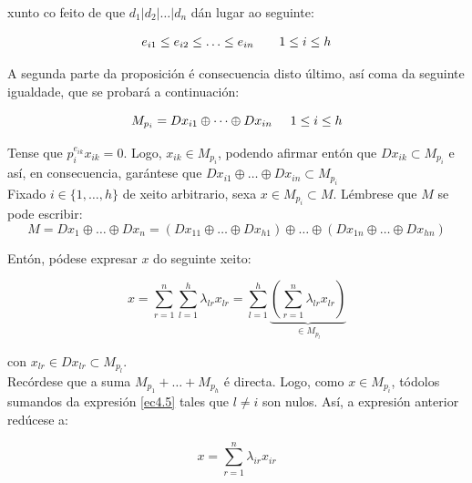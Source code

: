 \documentclass[twoside]{report}
\theoremstyle{mystyle}
\begin{document}
\noindent xunto co feito de que $d_{1} | d_{2} | \ldots | d_{n}$ dán lugar ao seguinte: 

$$e_{i1} \leq e_{i2}  \leq \ldots \leq e_{in} \hspace{7mm} 1 \leq i \leq h$$

\vspace{2mm}

\noindent A segunda parte da proposición é consecuencia disto último, así coma da seguinte igualdade, que se probará a continuación:

$$M_{p_{i}} = Dx_{i1} \oplus \dots \oplus Dx_{in} \hspace{5mm} 1 \leq i \leq h$$

\vspace{2mm}

\noindent {} Tense que $p_{i}^{e_{ik}}x_{ik} = 0$. Logo, $x_{ik} \in M_{p_{i}}$, podendo afirmar entón que $Dx_{ik} \subset M_{p_{i}}$ e así, en consecuencia, garántese que $Dx_{i1} \oplus \dots \oplus Dx_{in} \subset M_{p_{i}}$ \\

\noindent {} Fixado $i \in \{1, \ldots, h\}$ de xeito arbitrario, sexa $x \in M_{p_{i}} \subset M$. Lémbrese que $M$ se pode escribir:
$$M = Dx_{1} \oplus \dots \oplus Dx_{n} = (Dx_{11} \oplus \dots \oplus Dx_{h1}) \oplus \dots \oplus (Dx_{1n} \oplus \dots \oplus Dx_{hn}) $$

\vspace{2mm}

\noindent Entón, pódese expresar $x$ do seguinte xeito:

\begin{equation}\label{ec4.5}
x = \displaystyle \sum_{r = 1}^{n} \sum_{l = 1}^{h} \lambda_{lr}x_{lr} = \sum_{l = 1}^{h} \underbrace{\left (\sum_{r = 1}^{n}\lambda_{lr}x_{lr} \right )}_{\in M_{p_{l}}}
\end{equation}

\vspace{2mm}

\noindent con $x_{lr} \in Dx_{lr} \subset M_{p_{l}}$.\\

\noindent Recórdese que a suma $M_{p_{1}} + \dots + M_{p_{h}}$ é directa. Logo, como $x \in M_{p_{i}}$, tódolos sumandos da expresión \eqref{ec4.5} tales que $l \neq i$ son nulos. Así, a expresión anterior redúcese a:

$$x = \displaystyle \sum_{r = 1}^{n} \lambda_{ir}x_{ir}$$
\end{document}
